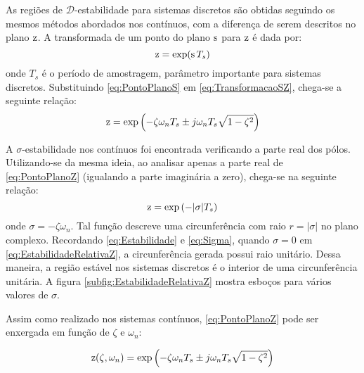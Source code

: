 As regiões de $\mathscr{D}$-estabilidade para sistemas discretos são obtidas seguindo os mesmos métodos abordados nos contínuos, com a diferença de serem descritos no plano $\operatorname{\mathrm{z}}$. A transformada de um ponto do plano $\operatorname{\mathrm{s}}$ para $\operatorname{\mathrm{z}}$ é dada por:
\begin{equation}
\operatorname{\mathrm{z}} = \exp(\operatorname{\mathrm{s}} T_s)\label{eq:TransformacaoSZ}
\end{equation}
onde $T_s$ é o período de amostragem, parâmetro importante para sistemas discretos\cite{KUO1980}. Substituindo \eqref{eq:PontoPlanoS} em \eqref{eq:TransformacaoSZ}, chega-se a seguinte relação:
\begin{equation}
\operatorname{\mathrm{z}} = \exp{\left(-\zeta\omega_nT_s \pm j\omega_nT_s\sqrt{1-\zeta^2}\right)}\label{eq:PontoPlanoZ}
\end{equation}

A $\sigma$-estabilidade nos contínuos foi encontrada verificando a parte real dos pólos. Utilizando-se da mesma ideia, ao analisar apenas a parte real de \eqref{eq:PontoPlanoZ} (igualando a parte imaginária a zero), chega-se na seguinte relação:
\begin{equation}
\operatorname{\mathrm{z}} = \exp{\left(-|\sigma|T_s\right)}\label{eq:EstabilidadeRelativaZ}
\end{equation}
onde $\sigma = -\zeta\omega_n$. Tal função descreve uma circunferência com raio $r = |\sigma|$ no plano complexo. Recordando \eqref{eq:Estabilidade} e \eqref{eq:Sigma}, quando $\sigma = 0$ em \eqref{eq:EstabilidadeRelativaZ}, a circunferência gerada possui raio unitário. Dessa maneira, a região estável nos sistemas discretos é o interior de uma circunferência unitária. A figura \ref{subfig:EstabilidadeRelativaZ} mostra esboços para vários valores de $\sigma$.

Assim como realizado nos sistemas contínuos, \eqref{eq:PontoPlanoZ} pode ser enxergada em função de $\zeta$ e $\omega_n$:

\begin{equation}
\operatorname{\mathrm{z}}(\zeta,\omega_n) = \exp{\left(-\zeta\omega_nT_s \pm j\omega_nT_s\sqrt{1-\zeta^2}\right)}\label{eq:FuncaoPontoZ}
\end{equation}

